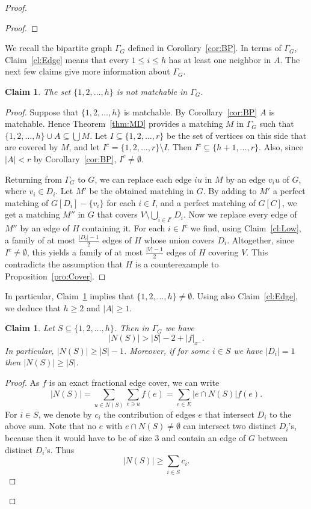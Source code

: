 \documentclass{article}
\newtheorem{claim}[theorem]{Claim}
\theoremstyle{definition}
\begin{document}
\begin{proof}
\begin{proof}
\end{proof}
We recall the bipartite graph $\Gamma_G$ defined in Corollary~\ref{cor:BP}. In terms of $\Gamma_G$, Claim~\ref{cl:Edge} means that every $1 \le i \le h$ has at least one neighbor in $A$. The next few claims give more information about $\Gamma_G$.
\begin{claim} \label{cl:No}
The set $\{1,2, \ldots , h\}$ is not matchable in $\Gamma_G$.
\end{claim}
\begin{proof} Suppose that $\{1,2, \ldots , h\}$ is matchable. By Corollary~\ref{cor:BP} $A$ is matchable. Hence Theorem~\ref{thm:MD} provides a matching $M$ in $\Gamma_G$ such that $\{1,2, \ldots , h\} \cup A \subseteq \bigcup M$. Let $I \subseteq \{1,2, \ldots , r\}$ be the set of vertices on this side that are covered by $M$, and let $I^c = \{1,2, \ldots , r\} \setminus I$. Then $I^c \subseteq \{h+1, \ldots , r\}$. Also, since $|A| < r$ by Corollary~\ref{cor:BP}, $I^c \ne \emptyset$.

Returning from $\Gamma_G$ to $G$, we can replace each edge $iu$ in $M$ by an edge $v_iu$ of $G$, where $v_i \in D_i$. Let $M'$ be the obtained matching in $G$. By adding to $M'$ a perfect matching of $G[D_i] - \{v_i\}$ for each $i \in I$, and a perfect matching of $G[C]$, we get a matching $M''$ in $G$ that covers $V \setminus \bigcup_{i \in I^c} D_i$. Now we replace every edge of $M''$ by an edge of $H$ containing it. For each $i \in I^c$ we find, using Claim~\ref{cl:Low}, a family of at most $\frac{|D_i|-1}{2}$ edges of $H$ whose union covers $D_i$. Altogether, since $I^c \ne \emptyset$, this yields a family of at most $\frac{|V|-1}{2}$ edges of $H$ covering $V$. This contradicts the assumption that $H$ is a counterexample to Proposition~\ref{pro:Cover}.
\end{proof}
In particular, Claim~\ref{cl:No} implies that $\{1,2, \ldots , h\} \ne \emptyset$. Using also Claim~\ref{cl:Edge}, we deduce that $h \ge 2$ and $|A| \ge 1$.
\begin{claim} \label{cl:SD}
Let $S \subseteq \{1,2, \ldots , h\}$. Then in $\Gamma_G$ we have \[ |N(S)| > |S| - 2 + |f|_{x^-}.\] In particular, $|N(S)| \ge |S| - 1$. Moreover, if for some $i \in S$ we have $|D_i| = 1$ then $|N(S)| \ge |S|$.
\end{claim}
\begin{proof} As $f$ is an exact fractional edge cover, we can write \[ |N(S)| = \sum_{u \in N(S)} \sum_{e \ni u} f(e) = \sum_{e \in E} |e \cap N(S)| f(e).\] For $i \in S$, we denote by $c_i$ the contribution of edges $e$ that intersect $D_i$ to the above sum. Note that no $e$ with $e \cap N(S) \ne \emptyset$ can intersect two distinct $D_i$'s, because then it would have to be of size $3$ and contain an edge of $G$ between distinct $D_i$'s. Thus
\begin{equation} \label{eq:nsci}
|N(S)| \ge \sum_{i \in S} c_i.
\end{equation}


\end{proof}
\end{proof}
\end{document}
